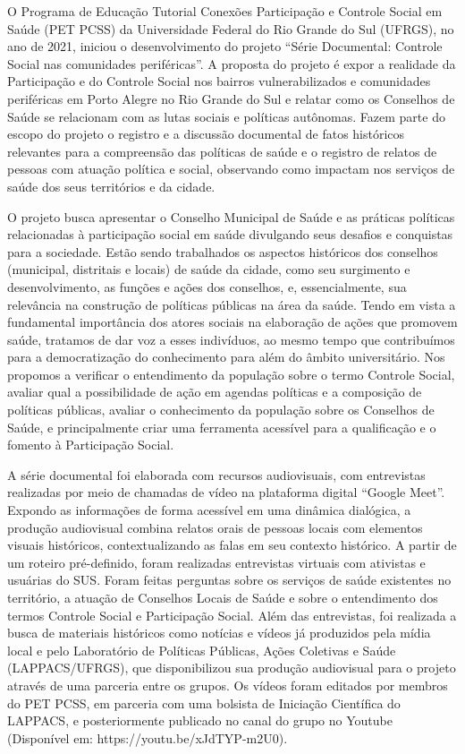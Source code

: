 O Programa de Educação Tutorial Conexões Participação e Controle Social em Saúde (PET PCSS) da Universidade Federal do Rio Grande do Sul (UFRGS), no ano de 2021, iniciou o desenvolvimento do projeto “Série Documental: Controle Social nas comunidades periféricas”. A proposta do projeto é expor a realidade da Participação e do Controle Social nos bairros vulnerabilizados e comunidades periféricas em Porto Alegre no Rio Grande do Sul e relatar como os Conselhos de Saúde se relacionam com as lutas sociais e políticas autônomas. Fazem parte do escopo do projeto o registro e a discussão documental de fatos históricos relevantes para a compreensão das políticas de saúde e o registro de relatos de pessoas com atuação política e social, observando como impactam nos serviços de saúde dos seus territórios e da cidade.

O projeto busca apresentar o Conselho Municipal de Saúde e as práticas políticas relacionadas à participação social em saúde divulgando seus desafios e conquistas para a sociedade. Estão sendo trabalhados os aspectos históricos dos conselhos (municipal, distritais e locais) de saúde da cidade, como seu surgimento e desenvolvimento, as funções e ações dos conselhos, e, essencialmente, sua relevância na construção de políticas públicas na área da saúde. Tendo em vista a fundamental importância dos atores sociais na elaboração de ações que promovem saúde, tratamos de dar voz a esses indivíduos, ao mesmo tempo que contribuímos para a democratização do conhecimento para além do âmbito universitário. Nos propomos a verificar o entendimento da população sobre o termo Controle Social, avaliar qual a possibilidade de ação em agendas políticas e a composição de políticas públicas, avaliar o conhecimento da população sobre os Conselhos de Saúde, e principalmente criar uma ferramenta acessível para a qualificação e o  fomento à Participação Social.

A série documental foi elaborada com recursos audiovisuais, com entrevistas realizadas por meio de chamadas de vídeo na plataforma digital “Google Meet”. Expondo as informações de forma acessível em uma dinâmica dialógica, a produção audiovisual combina relatos orais de pessoas locais com elementos visuais históricos, contextualizando as falas em seu contexto histórico. A partir de um roteiro pré-definido, foram realizadas entrevistas virtuais com ativistas e usuárias do SUS. Foram feitas perguntas sobre os serviços de saúde existentes no território, a atuação de Conselhos Locais de Saúde e sobre o entendimento dos termos Controle Social e Participação Social. Além das entrevistas, foi realizada a busca de materiais históricos como notícias e vídeos já produzidos pela mídia local e pelo Laboratório de Políticas Públicas, Ações Coletivas e Saúde (LAPPACS/UFRGS), que disponibilizou sua produção audiovisual para o projeto através de uma parceria entre os grupos. Os vídeos foram editados por membros do PET PCSS, em parceria com uma bolsista de Iniciação Científica do LAPPACS, e posteriormente publicado no canal do grupo no Youtube (Disponível em: https://youtu.be/xJdTYP-m2U0). 

